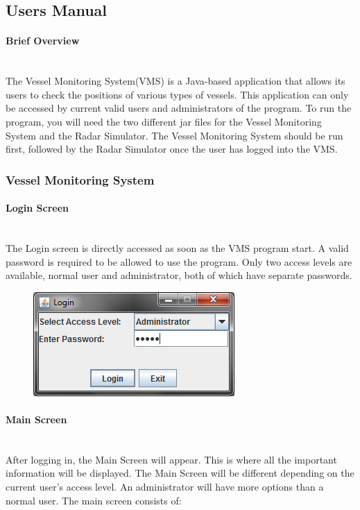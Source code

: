 \documentclass{article}
\begin{document}
\subsection{Users Manual}
\paragraph{Brief Overview \\ \\}

The Vessel Monitoring System(VMS) is a Java-based application that allows its users to check the positions of various types of vessels. This application can only be accessed by current valid users and administrators of the program. To run the program, you will need the two different jar files for the Vessel Monitoring System and the Radar Simulator. The Vessel Monitoring System should be run first, followed by the Radar Simulator once the user has logged into the VMS.

\subsubsection{Vessel Monitoring System}
\paragraph{Login Screen \\ \\}
The Login screen is directly accessed as soon as the VMS program start. A valid password is required to be allowed to use the program. Only two access levels are available, normal user and administrator, both of which have separate passwords.%

	\begin{figure}[!htb]
	\centering
	\includegraphics[scale=0.80]{images/userManual1.jpg}
	\end{figure}

\paragraph{Main Screen \\ \\}
After logging in, the Main Screen will appear. This is where all the important information will be displayed. The Main Screen will be different depending on the current user's access level. An administrator will have more options than a normal user. The main screen consists of:
\end{document}

